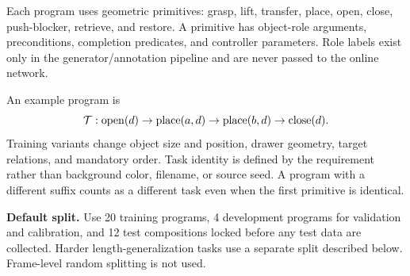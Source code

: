 \documentclass[
  10pt,
]{article}
\begin{document}
Each program uses geometric primitives: grasp, lift, transfer, place, open, close, push-blocker, retrieve, and restore. A primitive has object-role arguments, preconditions, completion predicates, and controller parameters. Role labels exist only in the generator/annotation pipeline and are never passed to the online network.

An example program is
\begin{equation}\label{eq:program}
{\cal T}:
{\rm open}(d)\rightarrow{\rm place}(a,d)
\rightarrow{\rm place}(b,d)\rightarrow{\rm close}(d).
\end{equation}
Training variants change object size and position, drawer geometry, target relations, and mandatory order. Task identity is defined by the requirement rather than background color, filename, or source seed. A program with a different suffix counts as a different task even when the first primitive is identical.

\textbf{Default split.} Use 20 training programs, 4 development programs for validation and calibration, and 12 test compositions locked before any test data are collected. Harder length-generalization tasks use a separate split described below. Frame-level random splitting is not used.
\end{document}
